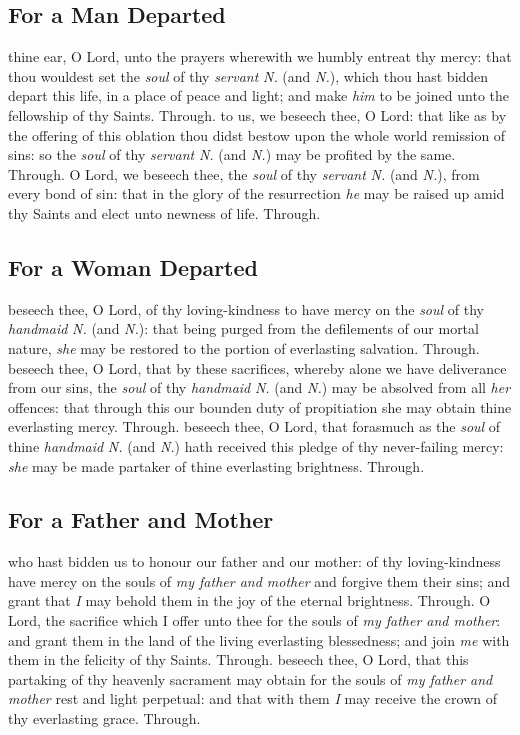 \begin{multicols}{2}
\subsection{For a Man Departed}
\collect
{} thine ear, O Lord, unto the prayers wherewith we humbly entreat thy mercy: that thou wouldest set the \textit{soul} of thy \textit{servant} \textit{N.} (and \textit{N.}), which thou hast bidden depart this life, in a place of peace and light; and make \textit{him} to be joined unto the fellowship of thy Saints. Through.
\secret
{} to us, we beseech thee, O Lord: that like as by the offering of this oblation thou didst bestow upon the whole world remission of sins: so the \textit{soul} of thy \textit{servant} \textit{N.} (and \textit{N.}) may be profited by the same. Through.
\postcommunion
{} O Lord, we beseech thee, the \textit{soul} of thy \textit{servant} \textit{N.} (and \textit{N.}), from every bond of sin: that in the glory of the resurrection \textit{he} may be raised up amid thy Saints and elect unto newness of life. Through.


\subsection{For a Woman Departed}
\collect
{} beseech thee, O Lord, of thy loving-kindness to have mercy on the \textit{soul} of thy \textit{handmaid} \textit{N.} (and \textit{N.}): that being purged from the defilements of our mortal nature, \textit{she} may be restored to the portion of everlasting salvation. Through.
\secret
{} beseech thee, O Lord, that by these sacrifices, whereby alone we have deliverance from our sins, the \textit{soul} of thy \textit{handmaid} \textit{N.} (and \textit{N.}) may be absolved from all \textit{her} offences: that through this our bounden duty of propitiation she may obtain thine everlasting mercy. Through.
\postcommunion
{} beseech thee, O Lord, that forasmuch as the \textit{soul} of thine \textit{handmaid} \textit{N.} (and \textit{N.}) hath received this pledge of thy never-failing mercy: \textit{she} may be made partaker of thine everlasting brightness. Through.

\subsection{For a Father and Mother}
\collect
{} who hast bidden us to honour our father and our mother: of thy loving-kindness have mercy on the souls of \textit{my father and mother} and forgive them their sins; and grant that \textit{I} may behold them in the joy of the eternal brightness. Through.
\secret
{} O Lord, the sacrifice which I offer unto thee for the souls of \textit{my father and mother}: and grant them in the land of the living everlasting blessedness; and join \textit{me} with them in the felicity of thy Saints. Through.
\postcommunion
{} beseech thee, O Lord, that this partaking of thy heavenly sacrament may obtain for the souls of \textit{my father and mother} rest and light perpetual: and that with them \textit{I} may receive the crown of thy everlasting grace. Through.


\end{multicols}
